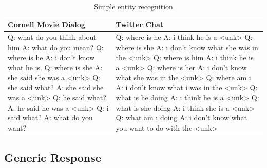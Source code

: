 \documentclass{article}
\begin{document}
\begin{table}[h]
    \caption{Simple entity recognition}
    \label{table:entity-recognition}
    \centering
\begin{tabular}{p{65mm}|p{75mm}}
  \toprule
  Cornell Movie Dialog & Twitter Chat \\
  \hline
Q: what do you think about him \newline
A: what do you mean? \newline
Q: where is he \newline
A: i don't know what he is. \newline
Q: where is she \newline
A: she said she was a <unk> \newline
Q: she said what? \newline
A: she said she was a <unk> \newline
Q: he said what? \newline
A: he said he was a <unk> \newline
Q: i said what? \newline
A: what do you want?
  &
Q: where is he \newline
A: i think he is a <unk> \newline
Q: where is she \newline
A: i don't know what she was in the <unk> \newline
Q: where is him \newline
A: i think he is a <unk> \newline
Q: where is her \newline
A: i don't know what she was in the <unk> \newline
Q: where am i \newline
A: i don't know what i was in the <unk> \newline
Q: what is he doing \newline
A: i think he is a <unk> \newline
Q: what is she doing \newline
A: i think she is a <unk> \newline
Q: what am i doing \newline
A: i don't know what you want to do with the <unk>
  \\
  \bottomrule
\end{tabular}
\end{table}

\subsection{Generic Response}
\label{subsec:generic-response}
\end{document}
